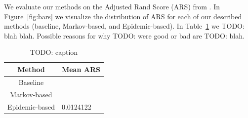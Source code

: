 \documentclass[twocolumn]{article}
\newcommand{\todo}[1]{}
\renewcommand{\todo}[1]{{\color{red} TODO: {#1}}}
\newcommand{\figref}[1]{Figure~\ref{fig:#1}}
\newcommand{\tblref}[1]{Table~\ref{tbl:#1}}
\newcommand{\tbllab}[1]{\label{tbl:#1}}
\begin{document}
We evaluate our methods on the Adjusted Rand Score (ARS) from
\cite{unnikrishnan2005measure}. In \figref{bars} we visualize the distribution
of ARS for each of our described methods (baseline, Markov-based, and
Epidemic-based). In \tblref{ars} we \todo{blah blah}. Possible reasons for why
\todo{were good or bad} are \todo{blah}.

\begin{table}
    \centering
    \caption{\todo{caption}}
    \tbllab{ars}

    \begin{tabular}{c|l}
        Method & Mean ARS \\ \hline
        Baseline & ~ \\
        Markov-based & ~ \\
        Epidemic-based & 0.0124122
    \end{tabular}
\end{table}
\end{document}
